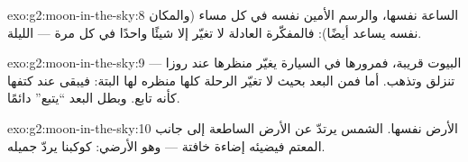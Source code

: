 \begin{solution}{exo:g2:moon-in-the-sky:8}
الساعة نفسها، والرسم الأمين نفسه في كل مساء (والمكان نفسه يساعد
أيضًا): فالمفكّرة العادلة لا تغيّر إلا شيئًا واحدًا في كل مرة
--- الليلة.
\end{solution}

\begin{solution}{exo:g2:moon-in-the-sky:9}
البيوت قريبة، فمرورها في السيارة يغيّر منظرها عند روزا ---
تنزلق وتذهب. أما  فمن البعد بحيث لا تغيّر الرحلة كلها
منظره لها البتة: فيبقى عند كتفها كأنه تابع. وبطل البعد ``يتبع''
دائمًا.
\end{solution}

\begin{solution}{exo:g2:moon-in-the-sky:10}
الأرض نفسها.  الشمس يرتدّ عن الأرض الساطعة إلى جانب 
المعتم فيضيئه إضاءة خافتة --- وهو  الأرضي: كوكبنا يردّ
 جميله.
\end{solution}
